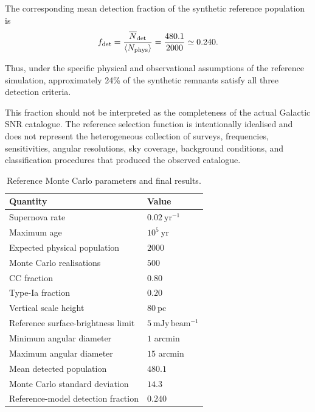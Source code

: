 \documentclass[
aps,
prd,
reprint,
superscriptaddress,
nofootinbib
]{revtex4-2}
\newcommand{\yr}{\mathrm{yr}}
\newcommand{\pc}{\mathrm{pc}}
\begin{document}
	The corresponding mean detection fraction of the synthetic reference
	population is
	\begin{equation}
		f_{\rm det}
		=
		\frac{\overline{N}_{\rm det}}
		{\langle N_{\rm phys}\rangle}
		=
		\frac{480.1}{2000}
		\simeq0.240.
		\label{eq:completeness}
	\end{equation}
	
	Thus, under the specific physical and observational assumptions of the
	reference simulation, approximately 24\% of the synthetic remnants satisfy
	all three detection criteria.
	
	This fraction should not be interpreted as the completeness of the actual
	Galactic SNR catalogue.  The reference selection function is intentionally
	idealised and does not represent the heterogeneous collection of surveys,
	frequencies, sensitivities, angular resolutions, sky coverage, background
	conditions, and classification procedures that produced the observed
	catalogue.
	\begin{table}[t]
		\caption{Reference Monte Carlo parameters and final results.}
		\label{tab:results}
		\begin{ruledtabular}
			\begin{tabular}{ll}
				\textbf{Quantity} & \textbf{Value} \\
				\hline
				Supernova rate & $0.02~\mathrm{yr^{-1}}$ \\
				Maximum age & $10^5~\yr$ \\
				Expected physical population & $2000$ \\
				Monte Carlo realisations & $500$ \\
				CC fraction & $0.80$ \\
				Type-Ia fraction & $0.20$ \\
				Vertical scale height & $80~\pc$ \\
				Reference surface-brightness limit &
				$5~\mathrm{mJy\,beam^{-1}}$ \\
				Minimum angular diameter & $1$ arcmin \\
				Maximum angular diameter & $15$ arcmin \\
				Mean detected population & $480.1$ \\
				Monte Carlo standard deviation & $14.3$ \\
				Reference-model detection fraction & $0.240$ \\
			\end{tabular}
		\end{ruledtabular}
	\end{table}
\end{document}
